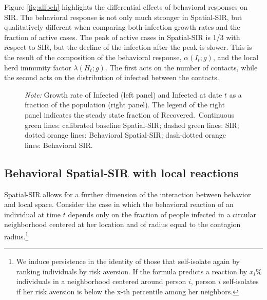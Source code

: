 \documentclass[english,11pt]{article}
\newcommand{\notegrowth}{\emph{Note:} Growth rate of Infected (left panel) and Infected at date $t$ as a fraction of the population (right panel). }
\newcommand{\notelegend}{The legend of the right panel indicates the steady state fraction of Recovered.}
\begin{document}
 Figure \ref{fig:allbeh} 
highlights   the differential effects of behavioral responses on SIR. 
The behavioral response is not
only much stronger in Spatial-SIR, but qualitatively different when comparing both infection growth rates and the fraction of active cases. The peak of active cases in Spatial-SIR is 1/3 with respect to SIR, but the decline of the infection after the peak is slower. This is the result of the composition of the behavioral response, $\alpha( I_t;g)$, and the local herd immunity factor $ \lambda(H_t;g)$.  The first acts on the number of contacts, while the second acts on the distribution of infected between the contacts.


\begin{figure}
    \centering
    \caption{Infection dynamics in SIR and Spatial-SIR, effects of behavioral responses}
    \label{fig:allbeh}
    \begin{subfigure}{\linewidth}
    \end{subfigure}
    
    \caption*{\normalfont\footnotesize 
    \notegrowth
    \notelegend \ Continuous green lines: calibrated baseline Spatial-SIR; dashed green lines: SIR; dotted orange lines: Behavioral Spatial-SIR; dash-dotted orange lines: Behavioral SIR.}   
\end{figure}

\subsection{Behavioral Spatial-SIR with local reactions} \label{sec-spSIR-local}
Spatial-SIR allows for a further dimension of the interaction between behavior and local space. Consider the case in which the behavioral reaction of an individual at time $t$ depends only on the fraction of people infected in a circular neighborhood centered at her location and of radius equal to the contagion radius.\footnote{We induce persistence in the identity of those that self-isolate again by ranking individuals by risk aversion. If the formula predicts a reaction by $x_i$\% individuals in a neighborhood centered around person $i$, person $i$ self-isolates if her risk aversion is below the x-th percentile among her neighbors.}
\end{document}
